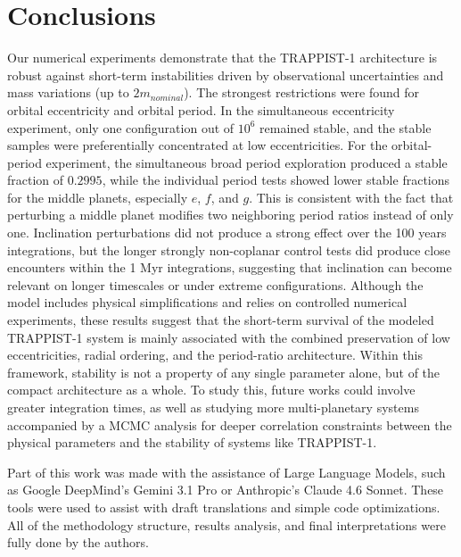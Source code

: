 \documentclass{aa}
\begin{document}
\section{Conclusions}
Our numerical experiments demonstrate that the TRAPPIST-1 architecture is robust against short-term instabilities driven by observational uncertainties and mass variations (up to $2m_{nominal}$). %
The strongest restrictions were found for orbital eccentricity and orbital period. In the simultaneous eccentricity experiment, only one configuration out of $10^6$ remained stable, and the stable samples were preferentially concentrated at low eccentricities. For the orbital-period experiment, the simultaneous broad period exploration produced a stable fraction of $0.2995$, while the individual period tests showed lower stable fractions for the middle planets, especially $e$, $f$, and $g$. This is consistent with the fact that perturbing a middle planet modifies two neighboring period ratios instead of only one. Inclination perturbations did not produce a strong effect over the 100 years integrations, but the longer strongly non-coplanar control tests did produce close encounters within the 1 Myr integrations, suggesting that inclination can become relevant on longer timescales or under extreme configurations. Although the model includes physical simplifications and relies on controlled numerical experiments, these results suggest that the short-term survival of the modeled TRAPPIST-1 system is mainly associated with the combined preservation of low eccentricities, radial ordering, and the period-ratio architecture. Within this framework, stability is not a property of any single parameter alone, but of the compact architecture as a whole. To study this, future works could involve greater integration times, as well as studying more multi-planetary systems accompanied by a MCMC analysis for deeper correlation constraints between the physical parameters and the stability of systems like TRAPPIST-1.


\begin{acknowledgements}
      Part of this work was made with the assistance of Large Language Models, such as Google DeepMind's Gemini 3.1 Pro or Anthropic's Claude 4.6 Sonnet. These tools were used to assist with draft translations and simple code optimizations. All of the methodology structure, results analysis, and final interpretations were fully done by the authors.
\end{acknowledgements}
\end{document}
